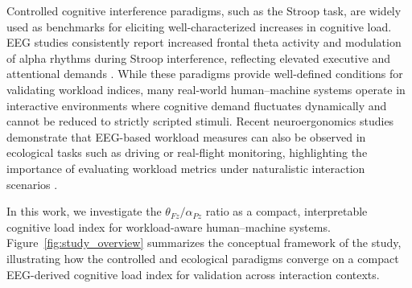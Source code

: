 \documentclass[10pt]{iopart}
\begin{document}
Controlled cognitive interference paradigms, such as the Stroop
task, are widely used as benchmarks for eliciting well-characterized
increases in cognitive load. EEG studies consistently report
increased frontal theta activity and modulation of alpha rhythms
during Stroop interference, reflecting elevated executive and
attentional demands \cite{c5,Nigbur2011_ThetaCognitiveInterference}.
While these paradigms provide well-defined conditions for validating
workload indices, many real-world human--machine systems operate in
interactive environments where cognitive demand fluctuates
dynamically and cannot be reduced to strictly scripted stimuli.
Recent neuroergonomics studies demonstrate that EEG-based workload
measures can also be observed in ecological tasks such as driving
or real-flight monitoring, highlighting the importance of
evaluating workload metrics under naturalistic interaction
scenarios \cite{DiFlumeri2018_RealDrivingMWL,Dehais2019_RealFlightDryEEG}.

In this work, we investigate the $\theta_{Fz}/\alpha_{Pz}$ ratio
as a compact, interpretable cognitive load index for workload-aware
human--machine systems. Figure~\ref{fig:study_overview} summarizes
the conceptual framework of the study, illustrating how the
controlled and ecological paradigms converge on a compact
EEG-derived cognitive load index for validation across interaction
contexts.
\end{document}
